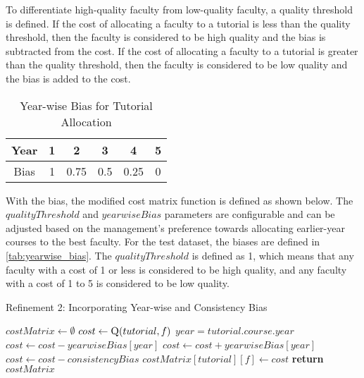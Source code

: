 To differentiate high-quality faculty from low-quality faculty, a quality threshold is defined. If the cost of allocating a faculty to a tutorial is less than the quality threshold, then the faculty is considered to be high quality and the bias is subtracted from the cost. If the cost of allocating a faculty to a tutorial is greater than the quality threshold, then the faculty is considered to be low quality and the bias is added to the cost.

\begin{table}[H]
  \centering
  \begin{tabular}{|c|c|c|c|c|c|}
    \hline
    Year & 1 & 2    & 3   & 4    & 5 \\ \hline
    Bias & 1 & 0.75 & 0.5 & 0.25 & 0 \\ \hline
  \end{tabular}
  \caption{Year-wise Bias for Tutorial Allocation}
  \label{tab:yearwise_bias}
\end{table}

With the bias, the modified cost matrix function is defined as shown below. The $qualityThreshold$ and $yearwiseBias$ parameters are configurable and can be adjusted based on the management's preference towards allocating earlier-year courses to the best faculty. For the test dataset, the biases are defined in \autoref{tab:yearwise_bias}. The $qualityThreshold$ is defined as 1, which means that any faculty with a cost of 1 or less is considered to be high quality, and any faculty with a cost of 1 to 5 is considered to be low quality.


\begin{algorithm}[H]
  \caption*{Refinement 2: Incorporating Year-wise and Consistency Bias}
  \begin{algorithmic}
    \State $costMatrix \gets \emptyset$
    \State $cost \gets \Call{Q}{tutorial, f}$
    \State $year = tutorial.course.year$
    \State $cost \gets cost - yearwiseBias[year]$
    \Else
    \State $cost \gets cost + yearwiseBias[year]$
    \EndIf
    \State $cost \gets cost - consistencyBias$
    \State $costMatrix[tutorial][f] \gets cost$
    \EndIf
    \EndFor
    \EndFor
    \State \textbf{return} $costMatrix$
    \EndProcedure
  \end{algorithmic}
\end{algorithm}

